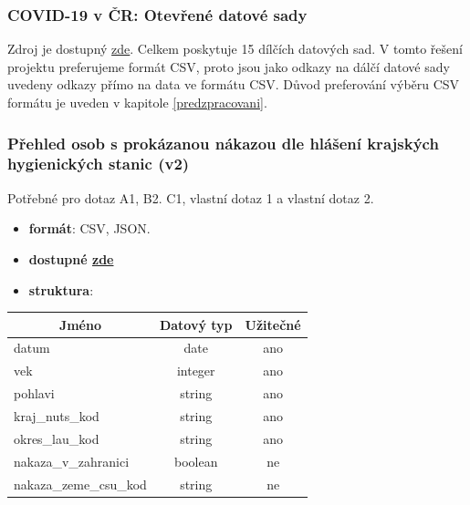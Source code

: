 \documentclass[12pt]{article}
\begin{document}
\subsubsection{COVID-19 v ČR: Otevřené datové sady}
\label{data1}
Zdroj je dostupný \href{https://onemocneni-aktualne.mzcr.cz/api/v2/covid-19}{zde}. Celkem poskytuje 15 dílčích datových sad. V tomto řešení projektu preferujeme formát CSV, proto jsou jako odkazy na dálčí datové sady uvedeny odkazy přímo na data ve formátu CSV. Důvod preferování výběru CSV formátu je uveden v kapitole \ref{predzpracovani}.


\subsubsection*{Přehled osob s prokázanou nákazou dle hlášení krajských hygienických stanic (v2)}
Potřebné pro dotaz A1, B2. C1, vlastní dotaz 1 a vlastní dotaz 2.
\begin{itemize}
    \item \textbf{formát}: CSV, JSON.
    \item \textbf{dostupné  \href{https://onemocneni-aktualne.mzcr.cz/api/v2/covid-19/osoby.csv}{zde}}
    \item \textbf{struktura}:
\end{itemize}
        \begin{center}
            \begin{tabular}{ |l|c|c| } 
                \hline
                \multicolumn{1}{|c|}{Jméno} & Datový typ & Užitečné \\
                \hline
                \hline
                datum & date & ano \\ 
                \hline
                vek & integer & ano \\ 
                \hline
                pohlavi & string & ano \\ 
                \hline
                kraj\_nuts\_kod & string & ano \\ 
                \hline
                okres\_lau\_kod & string & ano \\ 
                \hline
                nakaza\_v\_zahranici & boolean & ne \\ 
                \hline
                nakaza\_zeme\_csu\_kod & string & ne \\ 
                \hline
            \end{tabular}
        \end{center}
\end{document}
